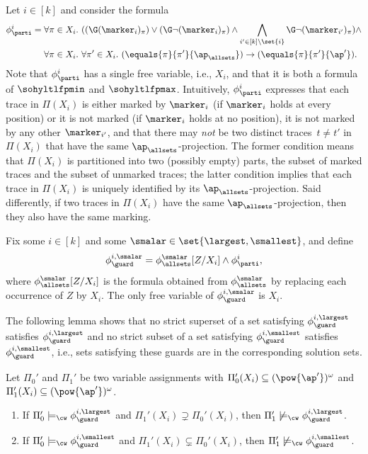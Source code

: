 Let $i \in [k]$ and consider the formula
\begin{align*}
\phi_\parti^{i} ={}&{} \forall \pi \in X_i.\ ((\G ({\marker_{i}})_\pi) \vee (\G \neg ({\marker_{i}})_\pi) \wedge \bigwedge_{i' \in [k]\setminus\set{i}}\G\neg(\marker_{i'})_\pi ) \wedge \\
{}&{}\forall \pi \in X_i.\ \forall \pi' \in X_i.\ (\equals{\pi}{\pi'}{\ap_\allsets }) \rightarrow (\equals{\pi}{\pi'}{\ap'}).   
\end{align*}
Note that $\phi_\parti^{i}$ has a single free variable, i.e., $X_i$, and that it is both a formula of $\sohyltlfpmin$ and $\sohyltlfpmax$.
Intuitively, $\phi_\parti^{i}$ expresses that each trace in $\Pi(X_i)$ is either marked by $\marker_{i}$ (if ${\marker_{i}}$ holds at every position) or it is not marked (if ${\marker_{i}}$ holds at no position), it is not marked by any other $\marker_{i'}$, and that there may \emph{not} be two distinct traces~$t \neq t'$ in $\Pi(X_i)$ that have the same $\ap_\allsets$-projection.
The former condition means that $\Pi(X_i)$ is partitioned into two (possibly empty) parts, the subset of marked traces and the subset of unmarked traces; the latter condition implies that each trace in $\Pi(X_i)$ is uniquely identified by its $\ap_\allsets$-projection. Said differently, if two traces in $\Pi(X_i)$ have the same $\ap_\allsets$-projection, then they also have the same marking. 

Fix some $i \in [k]$ and some $\smalar \in \set{\largest,\smallest}$, and define 
\[\phi_\guard^{i,\smalar} = \phi_\allsets^{\smalar}[Z/X_i] \wedge \phi_\parti^{i}, \]
where $\phi_\allsets^{\smalar}[Z/X_i]$ is the formula obtained from $\phi_\allsets^{\smalar}$ by replacing each occurrence of $Z$ by $X_i$.
The only free variable of $\phi_\guard^{i,\smalar}$ is $X_i$.

The following lemma shows that no strict superset of a set satisfying $\phi_\guard^{i,\largest}$ satisfies $\phi_\guard^{i,\largest}$ and no strict subset of a set satisfying $\phi_\guard^{i,\smallest}$ satisfies $\phi_\guard^{i,\smallest}$, i.e., sets satisfying these guards are in the corresponding solution sets.

\begin{lem}
\label{lemma_guardcorrectness}
Let $\Pi_0'$ and $\Pi_1'$ be two variable assignments with $\Pi_0'(X_i) \subseteq (\pow{\ap'})^\omega$ and  $\Pi_1'(X_i) \subseteq (\pow{\ap'})^\omega$.
\begin{enumerate}
    
    \item\label{lemma_guardcorrectness_largest}
    If $\Pi_0' \models_\cw \phi_\guard^{i,\largest}$ and $\Pi_1'(X_i) \supsetneq \Pi_0'(X_i)$, then $\Pi_1' \not\models_\cw \phi_\guard^{i,\largest}$.

    \item\label{lemma_guardcorrectness_smallest}
    If $\Pi_0' \models_\cw \phi_\guard^{i,\smallest}$ and $\Pi_1'(X_i) \subsetneq \Pi_0'(X_i)$, then $\Pi_1' \not\models_\cw \phi_\guard^{i,\smallest}$.

\end{enumerate}
\end{lem}

